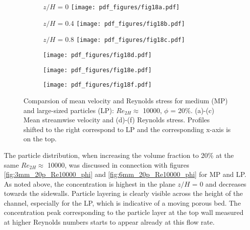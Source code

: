 \documentclass{jfm}
\begin{document}
\begin{figure}
\centering

\begin{subfigure}{.32\textwidth}
  \centering
  $z/H$ = 0
  \texttt{[image: pdf\_figures/fig18a.pdf]}
  \caption{}
  \label{fig:3_6mm_20p_Re10000_sp00mm_Umean}
\end{subfigure}%
\begin{subfigure}{.32\textwidth}
  \centering
  $z/H$ = 0.4
  \texttt{[image: pdf\_figures/fig18b.pdf]}
  \caption{}
  \label{fig:3_6mm_20p_Re10000_sp10mm_Umean}
\end{subfigure}
\begin{subfigure}{.32\textwidth}
  \centering
  $z/H$ = 0.8
  \texttt{[image: pdf\_figures/fig18c.pdf]}
  \caption{}
  \label{fig:3_6mm_20p_Re10000_sp20mm_Umean}
\end{subfigure}

\begin{subfigure}{.32\textwidth}
  \centering
  \texttt{[image: pdf\_figures/fig18d.pdf]}
  \caption{}
  \label{fig:3_6mm_20p_Re10000_sp00mm_uv}
\end{subfigure}%
\begin{subfigure}{.32\textwidth}
  \centering
  \texttt{[image: pdf\_figures/fig18e.pdf]}
  \caption{}
  \label{fig:3_6mm_20p_Re10000_sp10mm_uv}
\end{subfigure}
\begin{subfigure}{.32\textwidth}
  \centering
  \texttt{[image: pdf\_figures/fig18f.pdf]}
  \caption{}
  \label{fig:3_6mm_20p_Re10000_sp20mm_uv}
\end{subfigure}

\caption{Comparsion of mean velocity and Reynolds stress for medium (MP) and large-sized particles (LP): $Re_{2H}\approx$ 10000, $\phi$ = 20\%. (a)-(c) Mean streamwise velocity and (d)-(f) Reynolds stress. Profiles shifted to the right correspond to LP and the corresponding x-axis is on the top.}
\label{fig:3_6mm_20p_Re10000_Umean_uv}
\end{figure}

The particle distribution, when increasing the volume fraction to 20\% at the same $Re_{2H}\approx$ 10000, was discussed in connection with
figures \ref{fig:3mm_20p_Re10000_phi} and \ref{fig:6mm_20p_Re10000_phi} for MP and LP. As noted above, the concentration is highest in the plane $z/H$ = 0 and decreases towards the sidewalls. Particle layering is clearly visible across the height of the channel, especially for the LP, which is indicative of a moving porous bed. The concentration peak corresponding to the particle layer at the top wall measured at higher Reynolds numbers
starts to appear already at this flow rate.
\end{document}
